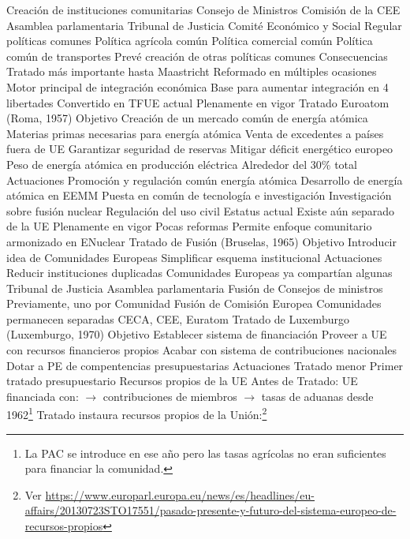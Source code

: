 \documentclass{nuevotema}
\begin{document}
\begin{esquemal}
				\4 Creación de instituciones comunitarias
				\4[] Consejo de Ministros
				\4[] Comisión de la CEE
				\4[] Asamblea parlamentaria
				\4[] Tribunal de Justicia
				\4[] Comité Económico y Social
				\4 Regular políticas comunes
				\4[] Política agrícola común
				\4[] Política comercial común
				\4[] Política común de transportes
				\4[] Prevé creación de otras políticas comunes
			\3 Consecuencias
				\4 Tratado más importante hasta Maastricht
				\4 Reformado en múltiples ocasiones
				\4 Motor principal de integración económica
				\4[] Base para aumentar integración en 4 libertades
				\4 Convertido en TFUE actual
				\4[] Plenamente en vigor
		\2 Tratado Euroatom (Roma, 1957)
			\3 Objetivo
				\4 Creación de un mercado común de energía atómica
				\4[] Materias primas necesarias para energía atómica
				\4 Venta de excedentes a países fuera de UE
				\4 Garantizar seguridad de reservas
				\4 Mitigar déficit energético europeo
				\4 Peso de energía atómica en producción eléctrica
				\4[] Alrededor del 30\% total
			\3 Actuaciones
				\4 Promoción y regulación común energía atómica
				\4 Desarrollo de energía atómica en EEMM
				\4 Puesta en común de tecnología e investigación
				\4 Investigación sobre fusión nuclear
				\4 Regulación del uso civil
			\3 Estatus actual
				\4 Existe aún separado de la UE
				\4 Plenamente en vigor
				\4 Pocas reformas
				\4 Permite enfoque comunitario armonizado en ENuclear
		\2 Tratado de Fusión (Bruselas, 1965)
			\3 Objetivo
				\4 Introducir idea de Comunidades Europeas
				\4 Simplificar esquema institucional
			\3 Actuaciones
				\4 Reducir instituciones duplicadas
				\4 Comunidades Europeas ya compartían algunas
				\4[] Tribunal de Justicia
				\4[] Asamblea parlamentaria
				\4 Fusión de Consejos de ministros
				\4[] Previamente, uno por Comunidad
				\4 Fusión de Comisión Europea
				\4 Comunidades permanecen separadas
				\4[] CECA, CEE, Euratom
		\2 Tratado de Luxemburgo (Luxemburgo, 1970)
			\3 Objetivo
				\4 Establecer sistema de financiación
				\4 Proveer a UE con recursos financieros propios
				\4 Acabar con sistema de contribuciones nacionales
				\4 Dotar a PE de compentencias presupuestarias
			\3 Actuaciones
				\4 Tratado menor
				\4 Primer tratado presupuestario
				\4 Recursos propios de la UE
				\4 Antes de Tratado:
				\4[] UE financiada con:
				\4[] $\to$ contribuciones de miembros
				\4[] $\to$ tasas de aduanas desde 1962\footnote{La PAC se introduce en ese año pero las tasas agrícolas no eran suficientes para financiar la comunidad.}
				\4 Tratado instaura recursos propios de la Unión:\footnote{Ver \url{https://www.europarl.europa.eu/news/es/headlines/eu-affairs/20130723STO17551/pasado-presente-y-futuro-del-sistema-europeo-de-recursos-propios}}

\end{esquemal}
\end{document}
